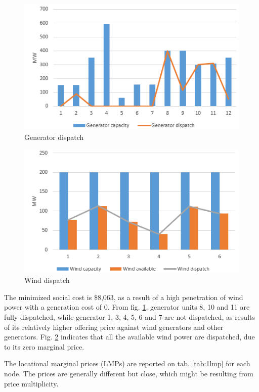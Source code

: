 \begin{figure}[h]
    \centering
    \includegraphics{figures/1generatordispatch.png}
    \caption{Generator dispatch}
    \label{fig:1.generator}
\end{figure}

\begin{figure}[h]
    \centering
    \includegraphics{figures/1winddispatch.png}
    \caption{Wind dispatch}
    \label{fig:1.wind}
\end{figure}

The minimized social cost is \$8,063, as a result of a high penetration of wind power with a generation cost of 0. From fig. \ref{fig:1.generator}, generator units 8, 10 and 11 are fully dispatched, while generator 1, 3, 4, 5, 6 and 7 are not dispatched, as results of its relatively higher offering price against wind generators and other generators. Fig. \ref{fig:1.wind} indicates that all the available wind power are dispatched, due to its zero marginal price.

The locational marginal prices (LMPs) are reported on tab. \ref{tab:1lmp} for each node. The prices are generally different but close, which might be resulting from price multiplicity.

